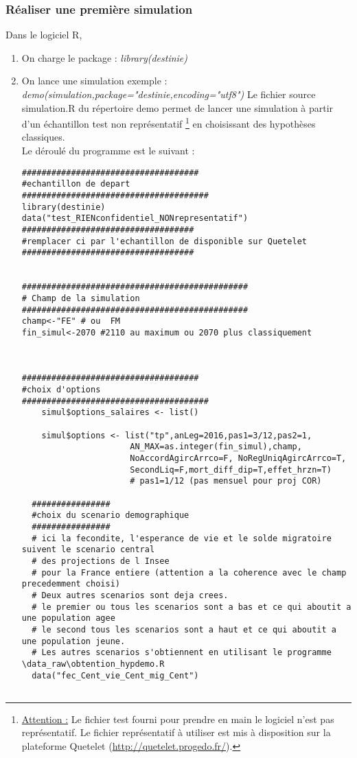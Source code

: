 \subsubsection{Réaliser une première simulation}
Dans le logiciel R,
\begin{enumerate}
\item On charge le package : \textit{library(destinie)}
\item On lance une simulation exemple : \textit{demo(simulation,package="destinie,encoding="utf8")} Le fichier source simulation.R du répertoire demo permet de lancer une simulation à partir d'un échantillon test non représentatif \footnote{\underline{Attention :} Le fichier test fourni pour prendre en main le logiciel n'est pas représentatif. Le fichier représentatif à utiliser est mis à disposition sur la plateforme Quetelet (\url{http://quetelet.progedo.fr/}).} en choisissant des hypothèses classiques.\\
Le déroulé du programme est le suivant :

\begin{lstlisting}
####################################
#echantillon de depart
######################################
library(destinie)
data("test_RIENconfidentiel_NONrepresentatif")
###################################
#remplacer ci par l'echantillon de disponible sur Quetelet 
###################################


##############################################
# Champ de la simulation 
##############################################
champ<-"FE" # ou  FM
fin_simul<-2070 #2110 au maximum ou 2070 plus classiquement



####################################
#choix d'options
######################################
    simul$options_salaires <- list()    
    
    simul$options <- list("tp",anLeg=2016,pas1=3/12,pas2=1,
                      AN_MAX=as.integer(fin_simul),champ,
                      NoAccordAgircArrco=F, NoRegUniqAgircArrco=T, 
                      SecondLiq=F,mort_diff_dip=T,effet_hrzn=T) 
                      # pas1=1/12 (pas mensuel pour proj COR)

  ################
  #choix du scenario demographique 
  ################
  # ici la fecondite, l'esperance de vie et le solde migratoire suivent le scenario central 
  # des projections de l Insee
  # pour la France entiere (attention a la coherence avec le champ precedemment choisi)
  # Deux autres scenarios sont deja crees.
  # le premier ou tous les scenarios sont a bas et ce qui aboutit a une population agee
  # le second tous les scenarios sont a haut et ce qui aboutit a une population jeune.    
  # Les autres scenarios s'obtiennent en utilisant le programme \data_raw\obtention_hypdemo.R    
  data("fec_Cent_vie_Cent_mig_Cent")


\end{lstlisting}
\end{enumerate}
